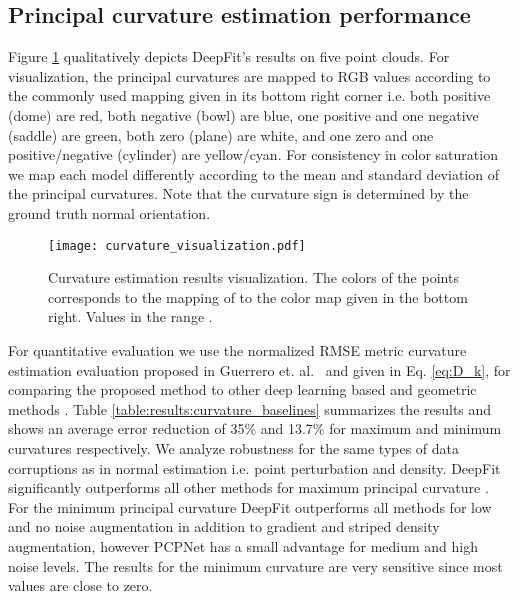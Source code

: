 \subsection{Principal curvature estimation performance}
\label{SubSec:results:baseline_c_est}
Figure \ref{fig:curvature_result_visualization} qualitatively depicts DeepFit's results on five point clouds. For visualization, the principal curvatures are mapped to RGB values according to the commonly used mapping given in its bottom right corner i.e. both positive (dome) are red, both negative (bowl) are blue, one positive and one negative (saddle) are green, both zero (plane) are white, and one zero and one positive/negative (cylinder) are yellow/cyan. For consistency in color saturation we map each model differently according to the mean and standard deviation of the principal curvatures.  Note that the curvature sign is determined by the ground truth normal orientation. 

\begin{figure}
\centering
    	\texttt{[image: curvature\_visualization.pdf]}
	\caption{Curvature estimation results visualization.  The colors of the points corresponds to the mapping of   to the color map given in the bottom right. Values in the range .}
	\label{fig:curvature_result_visualization}
\end{figure}

For quantitative evaluation we use the normalized RMSE metric curvature estimation evaluation proposed in Guerrero et. al.~\cite{guerrero2018pcpnet} and given in Eq. \ref{eq:D_k}, for comparing the proposed method to other deep learning based  \cite{guerrero2018pcpnet} and geometric methods \cite{cazals2005estimating}. Table \ref{table:results:curvature_baselines} summarizes the results and shows an average error reduction of 35\% and 13.7\% for maximum and minimum curvatures respectively. We analyze robustness for the same types of data corruptions as in normal estimation i.e. point perturbation and density. DeepFit significantly outperforms all other methods for maximum principal curvature . For the minimum principal curvature  DeepFit outperforms all methods for low and no noise augmentation in addition to gradient and striped density augmentation,  however PCPNet has a small advantage for medium and high noise levels. The results for the minimum curvature are very sensitive since most values are close to zero. 



